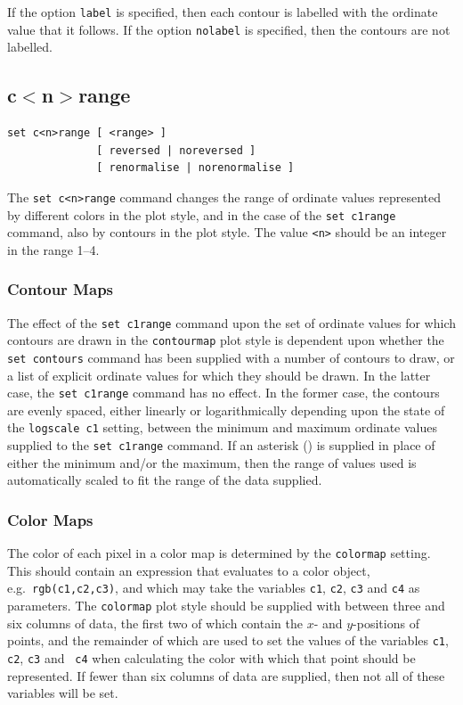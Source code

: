 If the option {\tt label} is specified, then each contour is labelled with the
ordinate value that it follows. If the option {\tt nolabel} is specified, then
the contours are not labelled.


\subsection{c$<$n$>$range}

\begin{verbatim}
set c<n>range [ <range> ]
              [ reversed | noreversed ]
              [ renormalise | norenormalise ]
\end{verbatim}

The {\tt set c<n>range} command changes the range of ordinate values
represented by different colors in the  plot style, and in
the case of the {\tt set c1range} command, also by contours in the
 plot style. The value {\tt <n>} should be an integer in the
range 1--4.

\subsubsection{Contour Maps}

The effect of the {\tt set c1range} command upon the set of ordinate values for
which contours are drawn in the {\tt contourmap} plot style is dependent upon
whether the {\tt set contours} command has been supplied with a number of
contours to draw, or a list of explicit ordinate values for which they should
be drawn. In the latter case, the {\tt set c1range} command has no effect. In
the former case, the contours are evenly spaced, either linearly or
logarithmically depending upon the state of the {\tt logscale c1} setting,
between the minimum and maximum ordinate values supplied to the {\tt set
c1range} command.  If an asterisk ({\tt *}) is supplied in place of either the
minimum and/or the maximum, then the range of values used is automatically
scaled to fit the range of the data supplied.

\subsubsection{Color Maps}

The color of each pixel in a color map is determined by the {\tt colormap}
setting. This should contain an expression that evaluates to a color object,
e.g.\ {\tt rgb(c1,c2,c3)}, and which may take the variables {\tt c1}, {\tt c2},
{\tt c3} and {\tt c4} as parameters. The {\tt colormap} plot style should be
supplied with between three and six columns of data, the first two of which
contain the $x$- and $y$-positions of points, and the remainder of which are
used to set the values of the variables {\tt c1}, {\tt c2}, {\tt c3} and {\tt
c4} when calculating the color with which that point should be represented. If
fewer than six columns of data are supplied, then not all of these variables
will be set.

